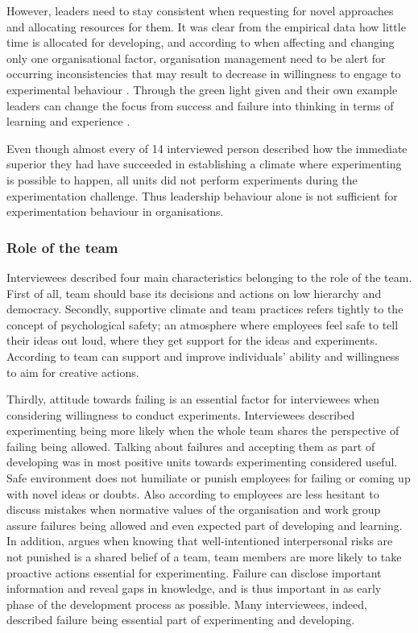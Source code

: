 However, leaders need to stay consistent when requesting for novel approaches and allocating resources for them. It was clear from the empirical data how little time is allocated for developing, and according to \citet{lee2004mixed} when affecting and changing only one organisational factor, organisation management need to be alert for occurring inconsistencies that may result to decrease in willingness to engage to experimental behaviour \citep{lee2004mixed}. Through the green light given and their own example leaders can change the focus from success and failure into thinking in terms of learning and experience \citep{farson2002failuretolerantleader}.

Even though almost every of 14 interviewed person described how the immediate superior they had have succeeded in establishing a climate where experimenting is possible to happen, all units did not perform experiments during the experimentation challenge. Thus leadership behaviour alone is not sufficient for experimentation behaviour in organisations.

\subsubsection*{Role of the team}
Interviewees described four main characteristics belonging to the role of the team. First of all, team should base its decisions and actions on low hierarchy and democracy. Secondly, supportive climate and team practices refers tightly to the concept of psychological safety; an atmosphere where employees feel safe to tell their ideas out loud, where they get support for the ideas and experiments. According to \citet{amabile1996assessing} team can support and improve individuals' ability and willingness to aim for creative actions. 

Thirdly, attitude towards failing is an essential factor for interviewees when considering willingness to conduct experiments. Interviewees described experimenting being more likely when the whole team shares the perspective of failing being allowed. Talking about failures and accepting them as part of developing was in most positive units towards experimenting considered useful. Safe environment does not humiliate or punish employees for failing or coming up with novel ideas or doubts. \citep{garvin2008yours, de2001minority,amabile2008creativity, amabile1996assessing} Also according to \citet{edmondson1996learning} employees are less hesitant to discuss mistakes when normative values of the organisation and work group assure failures being allowed and even expected part of developing and learning. In addition, \citet{garvin2008yours} argues when knowing that well-intentioned interpersonal risks are not punished is a shared belief of a team, team members are more likely to take proactive actions essential for experimenting. Failure can disclose important information and reveal gaps in knowledge, and is thus important in as early phase of the development process as possible. \citep{buijs2007innovation,thomke2001enlightened} Many interviewees, indeed, described failure being essential part of experimenting and developing. 

